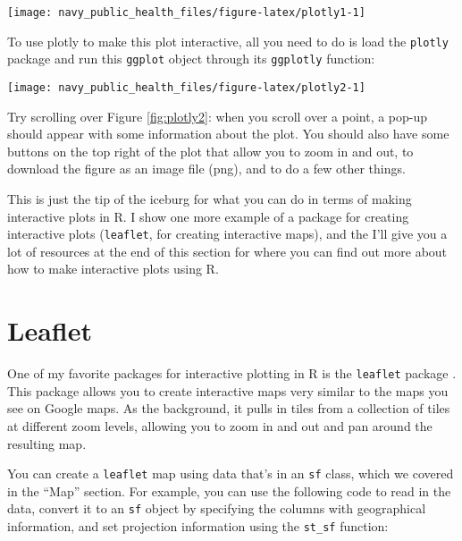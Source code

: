 \documentclass[]{tufte-book}
\newenvironment{Shaded}{}{}
\newcommand{\KeywordTok}[1]{\textcolor[rgb]{0.00,0.44,0.13}{\textbf{#1}}}
\newcommand{\NormalTok}[1]{#1}
\newcommand{\OperatorTok}[1]{\textcolor[rgb]{0.40,0.40,0.40}{#1}}
\newcommand{\StringTok}[1]{\textcolor[rgb]{0.25,0.44,0.63}{#1}}
\begin{document}
\begin{figure*}
\texttt{[image: navy\_public\_health\_files/figure-latex/plotly1-1]} \end{figure*}

To use plotly to make this plot interactive, all you need to do is load the \texttt{plotly} package and
run this \texttt{ggplot} object
through its \texttt{ggplotly} function:

\begin{Shaded}
\end{Shaded}

\begin{figure*}
\texttt{[image: navy\_public\_health\_files/figure-latex/plotly2-1]} \end{figure*}

Try scrolling over Figure \ref{fig:plotly2}: when you scroll over a point, a pop-up should
appear with some information about the plot. You should also have some buttons on the top
right of the plot that allow you to zoom in and out, to download the figure as an image
file (png), and to do a few other things.

This is just the tip of the iceburg for what you can do in terms of making interactive plots
in R. I show one more example of a package for creating interactive plots (\texttt{leaflet}, for
creating interactive maps), and the I'll give you a lot of resources at the end of this
section for where you can find out more about how to make interactive plots using R.

\hypertarget{leaflet}{%
\section{Leaflet}\label{leaflet}}

One of my favorite packages for interactive plotting in R is the \texttt{leaflet} package \citep{R-leaflet}.
This package allows you to create interactive maps very similar to the maps you see on Google maps.
As the background, it pulls in tiles from a collection of tiles at different zoom levels, allowing
you to zoom in and out and pan around the resulting map.

You can create a \texttt{leaflet} map using data that's in an \texttt{sf} class, which we covered in the ``Map''
section. For example, you can use the following code to read in the data, convert it to an \texttt{sf}
object by specifying the columns with geographical information, and set projection information
using the \texttt{st\_sf} function:
\end{document}
